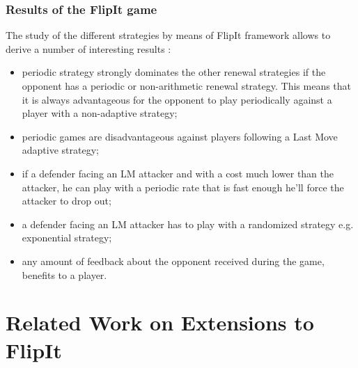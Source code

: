 \subsubsection{Results of the FlipIt game}
The study of the different strategies by means of FlipIt framework allows to derive a number of interesting results \cite{FlipIt}:  
\begin{itemize}
\item periodic strategy strongly dominates the other renewal strategies if the opponent has a periodic or non-arithmetic renewal strategy. This means that it is always advantageous for the opponent to play periodically against a player with a non-adaptive strategy;
\item periodic games are disadvantageous against players following a Last Move adaptive strategy;
\item if a defender facing an LM attacker and with a cost much lower than the attacker, he can play with a periodic rate that is fast enough he'll force the attacker to drop out;
\item a defender facing an LM attacker has to play with a randomized strategy e.g. exponential strategy;
\item any amount of feedback about the opponent received during the game, benefits to a player.
\end{itemize}
 

 
\section{Related Work on Extensions to FlipIt}
\label{ch1:extendedWork}

